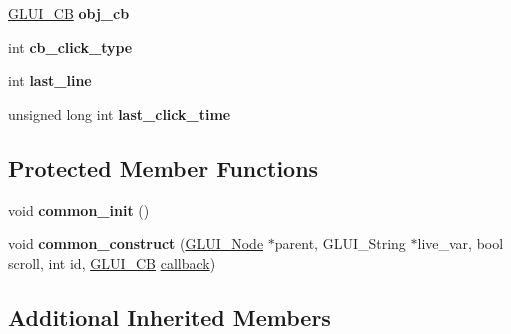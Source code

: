 \begin{DoxyCompactItemize}
\item 
\hypertarget{classGLUI__List_ada809121f5b61c3ec100ef2b2cc87a3e}{\hyperlink{classGLUI__CB}{G\-L\-U\-I\-\_\-\-C\-B} {\bfseries obj\-\_\-cb}}\label{classGLUI__List_ada809121f5b61c3ec100ef2b2cc87a3e}

\item 
\hypertarget{classGLUI__List_a10035be2d469c11e4009e77540bdf080}{int {\bfseries cb\-\_\-click\-\_\-type}}\label{classGLUI__List_a10035be2d469c11e4009e77540bdf080}

\item 
\hypertarget{classGLUI__List_a500f3a7a615367a44088d69c8e537ba6}{int {\bfseries last\-\_\-line}}\label{classGLUI__List_a500f3a7a615367a44088d69c8e537ba6}

\item 
\hypertarget{classGLUI__List_a1bf88496c2ffcb4cc41ee24f8d58c2a5}{unsigned long int {\bfseries last\-\_\-click\-\_\-time}}\label{classGLUI__List_a1bf88496c2ffcb4cc41ee24f8d58c2a5}

\end{DoxyCompactItemize}
\subsection*{Protected Member Functions}
\begin{DoxyCompactItemize}
\item 
\hypertarget{classGLUI__List_a2693fbb3bd3dd6bb051ca1f02d4a017c}{void {\bfseries common\-\_\-init} ()}\label{classGLUI__List_a2693fbb3bd3dd6bb051ca1f02d4a017c}

\item 
\hypertarget{classGLUI__List_abe3d92ffe3c2795adb4b0b2bec3a390a}{void {\bfseries common\-\_\-construct} (\hyperlink{classGLUI__Node}{G\-L\-U\-I\-\_\-\-Node} $\ast$parent, G\-L\-U\-I\-\_\-\-String $\ast$live\-\_\-var, bool scroll, int id, \hyperlink{classGLUI__CB}{G\-L\-U\-I\-\_\-\-C\-B} \hyperlink{classGLUI__Control_a96060fe0cc6d537e736dd6eef78e24ab}{callback})}\label{classGLUI__List_abe3d92ffe3c2795adb4b0b2bec3a390a}

\end{DoxyCompactItemize}
\subsection*{Additional Inherited Members}


